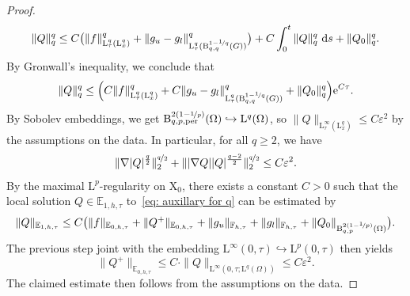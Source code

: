 \documentclass[10pt,a4paper]{amsart}
\newcommand{\E}{\mathbb{E}}
\newcommand{\F}{\mathbb{F}}
\newcommand{\eps}{\varepsilon}
\newcommand{\per}{\mathrm{per}}
\newcommand{\rB}{\mathrm{B}}
\newcommand{\rL}{\mathrm{L}}
\newcommand{\rLp}{\rL^p}
\newcommand{\rLq}{\rL^q}
\newcommand{\rX}{\mathrm{X}}
\begin{document}
\begin{proof}
\begin{equation*}
    \| Q \|^q_q \leq C \bigl (\| f \|^q_{\rLq_\tau(\rL_x^q)} +\| g_u -g_l \|^q_{\rLq_\tau(\rB_{q,q}^{1 - \nicefrac{1}{q}}(G))}\bigr )+ C \int_0^t \| Q \|^q_q \ \mathrm{d}s + \| Q_0 \|^q_q.
\end{equation*}
By Gronwall's inequality, we conclude that
\begin{equation*}
    \| Q \|^q_q \leq \Bigl ( C  \| f \|^q_{\rLq_\tau(\rL_x^q)} +C\| g_u -g_l \|^q_{\rLq_\tau(\rB_{q,q}^{1 - \nicefrac{1}{q}}(G))} + \| Q_0 \|^q_q \Bigr ) \mathrm{e}^{C\tau}.
\end{equation*}
By Sobolev embeddings, we get $\rB^{2(1-\nicefrac{1}{p})}_{q,p,\per}(\Omega) \hookrightarrow \rLq(\Omega)$, so $\| Q\|_{\rL^\infty_\tau(\rL_x^q)} \leq C \eps^2$ by the assumptions on the data.
In particular, for all $q \geq 2$, we have 
\begin{equation*}
     \| \nabla | Q |^{\frac{q}{2}} \|^{\nicefrac{q}{2}}_2 + \| |\nabla Q|  | Q|^{\frac{q-2}{2}} \|^{\nicefrac{q}{2}}_2 \leq C \eps^2.
\end{equation*}
By the maximal $\rLp$-regularity on $\rX_0$, there exists a constant $C>0$ such that the local solution $Q \in \E_{1,h,\tau}$ to~\eqref{eq: auxillary for q} can be estimated by 
   \begin{equation*}
       \| Q \|_{\E_{1,h,\tau}} \leq C \bigl ( \| f \|_{\E_{0,h,\tau}} + \| Q^+\|_{\E_{0,h,\tau}}
       + \| g_u \|_{\F_{h,\tau}} +\| g_l \|_{\F_{h,\tau}} + \| Q_0 \|_{\rB_{q,p}^{2(1-\nicefrac{1}{p})}(\Omega)} \bigr ).
   \end{equation*}
The previous step joint with the embedding $\rL^\infty(0,\tau) \hookrightarrow \rLp(0,\tau)$ then yields
\begin{equation*}
    \| Q^+\|_{\E_{0,h,\tau}} \leq C \cdot \| Q \|_{\rL^\infty(0,\tau;\rLq(\Omega)) } \leq C\eps^2.
\end{equation*}
The claimed estimate then follows from the assumptions on the data.
\end{proof}
\end{document}
